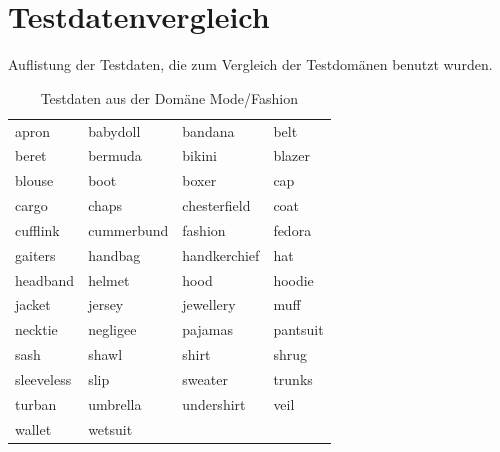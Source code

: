 \documentclass[12pt,a4paper]{report}
\begin{document}
\section{Testdatenvergleich}
\label{Testdatenvergleich}
Auflistung der Testdaten, die zum Vergleich der Testdomänen benutzt wurden.\\


\begin{table}[H]
\caption{Testdaten aus der Domäne Mode/Fashion}
\begin{center}

\begin{tabular}{l|l|l|l}
apron & babydoll & bandana & belt\\
beret & bermuda & bikini & blazer\\
blouse & boot & boxer & cap\\
cargo & chaps & chesterfield & coat\\
cufflink & cummerbund & fashion & fedora\\
gaiters & handbag & handkerchief & hat\\
headband & helmet & hood & hoodie\\
jacket & jersey & jewellery & muff\\
necktie & negligee & pajamas & pantsuit\\
sash & shawl & shirt & shrug\\
sleeveless & slip & sweater & trunks\\
turban & umbrella & undershirt & veil\\
wallet & wetsuit &  & \\
\end{tabular}\\

\end{center}
\end{table}
\end{document}
